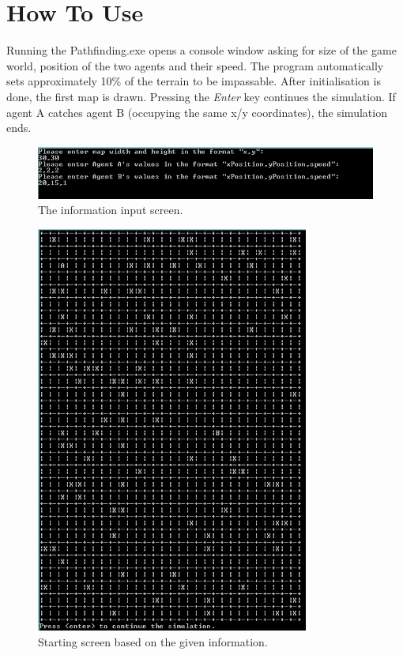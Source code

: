 \section{How To Use}
Running the Pathfinding.exe opens a console window asking for size of the game world, position of the two agents and their speed. The program automatically sets approximately 10\% of the terrain to be impassable. After initialisation is done, the first map is drawn. Pressing the \textit{Enter} key continues the simulation. If agent A catches agent B (occupying the same x/y coordinates), the simulation ends.

\begin{figure}[h!]
  \centering
    \includegraphics[width=1\textwidth]{Screenshots/StartingScreen}
  \caption{The information input screen.}
\end{figure}

\begin{figure}[h!]
  \centering
    \includegraphics[width=0.8\textwidth]{Screenshots/Map}
  \caption{Starting screen based on the given information.}
\end{figure}
\clearpage